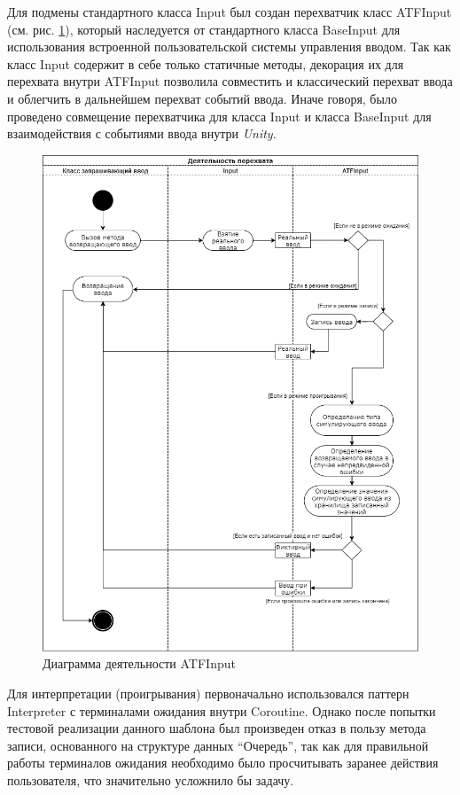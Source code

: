 Для подмены стандартного класса Input был создан перехватчик класс ATFInput (см. рис. \ref{atfInput}), который наследуется от стандартного класса BaseInput для использования встроенной пользовательской системы управления вводом. Так как класс Input содержит в себе только статичные методы, декорация их для перехвата внутри ATFInput позволила совместить и классический перехват ввода и облегчить в дальнейшем перехват событий ввода. Иначе говоря, было проведено совмещение перехватчика для класса Input и класса BaseInput для взаимодействия с событиями ввода внутри \textit{Unity}. 

\begin{figure}[H]
	\centering
	\includegraphics[width=\linewidth]{atfInput.png}
	\caption{Диаграмма деятельности ATFInput}
	\label{atfInput}
\end{figure}


Для интерпретации (проигрывания) первоначально использовался паттерн Interpreter с терминалами ожидания внутри Coroutine. Однако после попытки тестовой реализации данного шаблона был произведен отказ в пользу метода записи, основанного на структуре данных ``Очередь'', так как для правильной работы терминалов ожидания необходимо было просчитывать заранее действия пользователя, что значительно усложнило бы задачу.